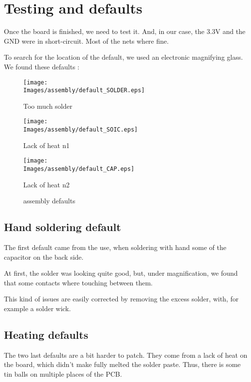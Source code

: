 \section{Testing and defaults}\label{sec:defaults}
Once the board is finished, we need to test it. And, in our case, the $3.3
    \si{\volt}$ and the GND were in short-circuit. Most of the nets where fine.

To search for the location of the default, we used an electronic magnifying
glass. We found these defaults :

\begin{figure}[!hbt]
    \centering
    \begin{minipage}[c]{0.32\textwidth}
        \centering
        \texttt{[image: \\Images/assembly/default\_SOLDER.eps]}
        \caption*{Too much solder}
    \end{minipage}%
    \hfill%
    \begin{minipage}[c]{0.32\textwidth}
        \centering
        \texttt{[image: \\Images/assembly/default\_SOIC.eps]}
        \caption*{Lack of heat n1}
    \end{minipage}%
    \hfill%
    \begin{minipage}[c]{0.32\textwidth}
        \centering
        \texttt{[image: \\Images/assembly/default\_CAP.eps]}
        \caption*{Lack of heat n2}
    \end{minipage}%
    \label{img:defaults}
    \caption{assembly defaults}
\end{figure}
\FloatBarrier

\subsection{Hand soldering default}
The first default came from the use, when soldering with hand some of the
capacitor on the back side.

At first, the solder was looking quite good, but, under magnification, we found
that some contacts where touching between them.

This kind of issues are easily corrected by removing the excess solder, with,
for example a solder wick.

\subsection{Heating defaults}
The two last defaults are a bit harder to patch. They come from a lack of heat
on the board, which didn't make fully melted the solder paste. Thus, there is
some tin balls on multiple places of the PCB.

